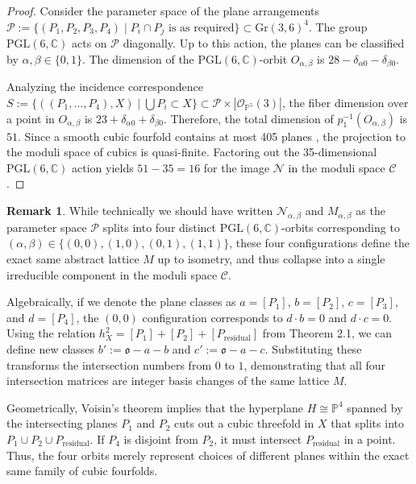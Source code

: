 \documentclass[11pt,letterpaper]{amsart} %
\theoremstyle{definition}
\newtheorem{remark}[theorem]{Remark}
\begin{document}
\begin{proof}
Consider the parameter space of the plane arrangements $\mathcal{P} := \{(P_1, P_2, P_3, P_4) \mid P_i \cap P_j \text{ is as required}\} \subset \text{Gr}(3,6)^4$. %
The group $\text{PGL}(6, \mathbb{C})$ acts on $\mathcal{P}$ diagonally. %
Up to this action, the planes can be classified by $\alpha, \beta \in \{0, 1\}$. %
The dimension of the $\text{PGL}(6, \mathbb{C})$-orbit $O_{\alpha,\beta}$ is $28 - \delta_{\alpha 0} - \delta_{\beta 0}$. %

Analyzing the incidence correspondence $S := \{((P_1,\dots,P_4), X) \mid \bigcup P_i \subset X\} \subset \mathcal{P} \times |\mathcal{O}_{\mathbb{P}^5}(3)|$, the fiber dimension over a point in $O_{\alpha,\beta}$ is $23 + \delta_{\alpha 0} + \delta_{\beta 0}$. %
Therefore, the total dimension of $p_1^{-1}(O_{\alpha,\beta})$ is $51$. %
Since a smooth cubic fourfold contains at most 405 planes \cite{DIO}, the projection to the moduli space of cubics is quasi-finite. %
Factoring out the 35-dimensional $\text{PGL}(6, \mathbb{C})$ action yields $51 - 35 = 16$ for the image $\mathcal{N}$ in the moduli space $\mathcal{C}$. %
\end{proof}

\begin{remark}
While technically we should have written $\mathcal{N}_{\alpha,\beta}$ and $M_{\alpha,\beta}$ as the parameter space $\mathcal{P}$ splits into four distinct $\text{PGL}(6, \mathbb{C})$-orbits corresponding to $(\alpha, \beta) \in \{(0,0), (1,0), (0,1), (1,1)\}$, these four configurations define the exact same abstract lattice $M$ up to isometry, and thus collapse into a single irreducible component in the moduli space $\mathcal{C}$.

Algebraically, if we denote the plane classes as $a = [P_1]$, $b = [P_2]$, $c = [P_3]$, and $d = [P_4]$, the $(0,0)$ configuration corresponds to $d\cdot b = 0$ and $d\cdot c = 0$. Using the relation $h_X^2 = [P_1] + [P_2] + [P_{\text{residual}}]$ from Theorem 2.1, we can define new classes $b' := \mathfrak{o} - a - b$ and $c' := \mathfrak{o} - a - c$. Substituting these transforms the intersection numbers from $0$ to $1$, demonstrating that all four intersection matrices are integer basis changes of the same lattice $M$.

Geometrically, Voisin's theorem implies that the hyperplane $H \cong \mathbb{P}^4$ spanned by the intersecting planes $P_1$ and $P_2$ cuts out a cubic threefold in $X$ that splits into $P_1 \cup P_2 \cup P_{\text{residual}}$. If $P_4$ is disjoint from $P_2$, it must intersect $P_{\text{residual}}$ in a point. Thus, the four orbits merely represent choices of different planes within the exact same family of cubic fourfolds.
\end{remark}
\end{document}
